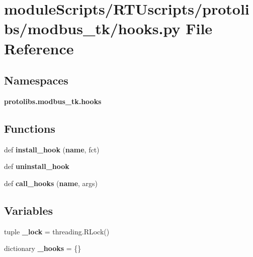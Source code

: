 \section{module\+Scripts/\+R\+T\+Uscripts/protolibs/modbus\+\_\+tk/hooks.py File Reference}
\label{modbus__tk_2hooks_8py}
\subsection*{Namespaces}
\begin{DoxyCompactItemize}
\item 
 {\bf protolibs.\+modbus\+\_\+tk.\+hooks}
\end{DoxyCompactItemize}
\subsection*{Functions}
\begin{DoxyCompactItemize}
\item 
def {\bf install\+\_\+hook} ({\bf name}, fct)
\item 
def {\bf uninstall\+\_\+hook}
\item 
def {\bf call\+\_\+hooks} ({\bf name}, args)
\end{DoxyCompactItemize}
\subsection*{Variables}
\begin{DoxyCompactItemize}
\item 
tuple {\bf \+\_\+lock} = threading.\+R\+Lock()
\item 
dictionary {\bf \+\_\+hooks} = \{\}
\end{DoxyCompactItemize}
